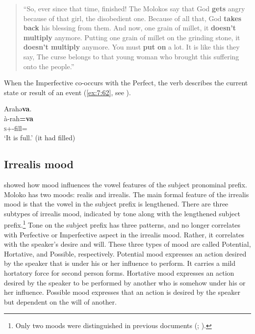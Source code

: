 \begin{quote}{“So, ever since that time, finished! The Molokos say that God \textbf{gets} angry because of that girl, the disobedient one. Because of all that, God \textbf{takes back} his blessing from them. And now, one grain of millet, it \textbf{doesn’t multiply} anymore. Putting one grain of millet on the grinding stone, it \textbf{doesn’t multiply} anymore. You must \textbf{put on} a lot. It is like this they say, The curse belongs to that young woman who brought this suffering onto the people.”}\end{quote}

When the Imperfective  co-occurs with the Perfect, the verb describes the current state or result of an event (\ref{ex:7:62}, see ).

\ea\label{ex:7:62}
Arahə\textbf{va}.\\
\gll  à-rah\textbf{=va}\\
      \textsc{s}+{\PFV}-fill={\PRF}\\
\glt  ‘It is full.’ (it had filled)\\
\z 
{}
\subsection{Irrealis mood}\label{sec:7.4.3}
\hypertarget{RefHeading1212261525720847}{}
\citet{FriesenMamalis2008} showed how mood influences the vowel features of the subject pronominal prefix. Moloko has two moods: realis and irrealis. The main formal feature of the irrealis mood is that the vowel in the subject prefix is lengthened. There are three subtypes of irrealis mood, indicated by tone along with the lengthened subject prefix.\footnote{Only two moods were distinguished in previous documents (\citealt{FriesenMamalis2008}; \citealt{Boyd2003}).} Tone on the subject prefix has three patterns, and no longer correlates with Perfective or Imperfective aspect in the irrealis mood. Rather, it correlates with the speaker’s desire and will. These three types of mood are called Potential, Hortative, and Possible, respectively. Potential mood expresses an action desired by the speaker that is under his or her influence to perform. It carries a mild hortatory force for second person forms. Hortative mood expresses an action desired by the speaker to be performed by another who is somehow under his or her influence. Possible mood expresses that an action is desired by the speaker but dependent on the will of another.

